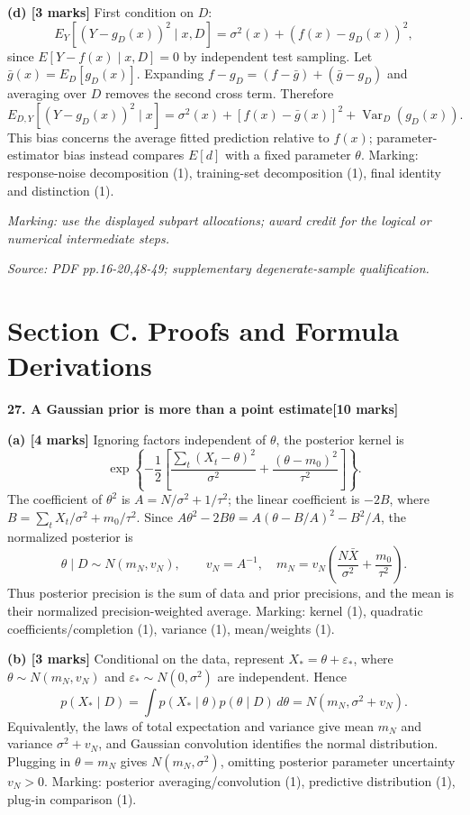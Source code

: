 \documentclass[11pt,a4paper]{article}
\begin{document}
\textbf{(d) [3 marks]} First condition on \(D\):
\[
E_Y[(Y-g_D(x))^2\mid x,D]
=\sigma^2(x)+(f(x)-g_D(x))^2,
\]
since \(E[Y-f(x)\mid x,D]=0\) by independent test sampling. Let \(\bar g(x)=E_D[g_D(x)]\). Expanding \(f-g_D=(f-\bar g)+(\bar g-g_D)\) and averaging over \(D\) removes the second cross term. Therefore
\[
E_{D,Y}[(Y-g_D(x))^2\mid x]
=\sigma^2(x)+[f(x)-\bar g(x)]^2+
\operatorname{Var}_D(g_D(x)).
\]
This bias concerns the average fitted prediction relative to \(f(x)\); parameter-estimator bias instead compares \(E[d]\) with a fixed parameter \(\theta\). Marking: response-noise decomposition (1), training-set decomposition (1), final identity and distinction (1).

\textit{Marking: use the displayed subpart allocations; award credit for the logical or numerical intermediate steps.}\par
{\footnotesize\textit{Source: PDF pp.16-20,48-49; supplementary degenerate-sample qualification.}}
\newpage\section*{Section C. Proofs and Formula Derivations}
\textbf{27. A Gaussian prior is more than a point estimate}\hfill\textbf{[10 marks]}\par\medskip
\textbf{(a) [4 marks]} Ignoring factors independent of \(\theta\), the posterior kernel is
\[
\exp\left\{-\frac12\left[
\frac{\sum_t(X_t-\theta)^2}{\sigma^2}
+\frac{(\theta-m_0)^2}{\tau^2}\right]\right\}.
\]
The coefficient of \(\theta^2\) is \(A=N/\sigma^2+1/\tau^2\); the linear coefficient is \(-2B\), where \(B=\sum_tX_t/\sigma^2+m_0/\tau^2\). Since \(A\theta^2-2B\theta=A(\theta-B/A)^2-B^2/A\), the normalized posterior is
\[
\theta\mid D\sim N(m_N,v_N),\qquad
v_N=A^{-1},\quad
m_N=v_N\left(\frac{N\bar X}{\sigma^2}+\frac{m_0}{\tau^2}\right).
\]
Thus posterior precision is the sum of data and prior precisions, and the mean is their normalized precision-weighted average. Marking: kernel (1), quadratic coefficients/completion (1), variance (1), mean/weights (1).

\textbf{(b) [3 marks]} Conditional on the data, represent \(X_*=\theta+\varepsilon_*\), where \(\theta\sim N(m_N,v_N)\) and \(\varepsilon_*\sim N(0,\sigma^2)\) are independent. Hence
\[
p(X_*\mid D)=\int p(X_*\mid\theta)p(\theta\mid D)\,d\theta
=N(m_N,\sigma^2+v_N).
\]
Equivalently, the laws of total expectation and variance give mean \(m_N\) and variance \(\sigma^2+v_N\), and Gaussian convolution identifies the normal distribution. Plugging in \(\theta=m_N\) gives \(N(m_N,\sigma^2)\), omitting posterior parameter uncertainty \(v_N>0\). Marking: posterior averaging/convolution (1), predictive distribution (1), plug-in comparison (1).
\end{document}
